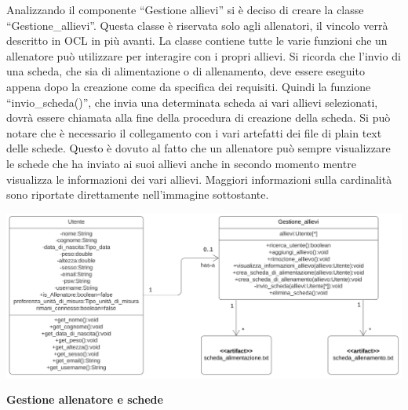 \documentclass{article}
\begin{document}
      Analizzando il componente “Gestione allievi” si è deciso di creare la classe “Gestione\_allievi”. Questa classe è riservata solo agli allenatori, il vincolo verrà descritto in OCL in più avanti. La classe contiene tutte le varie funzioni che un allenatore può utilizzare per interagire con i propri allievi. Si ricorda che l’invio di una scheda, che sia di alimentazione o di allenamento, deve essere eseguito appena dopo la creazione come da specifica dei requisiti. Quindi la funzione “invio\_scheda()”, che invia una determinata scheda ai vari allievi selezionati, dovrà essere chiamata alla fine della procedura di creazione della scheda.
      Si può notare che è necessario il collegamento con i vari artefatti dei file di plain text delle schede. Questo è dovuto al fatto che un allenatore può sempre visualizzare le schede che ha inviato ai suoi allievi anche in secondo momento mentre visualizza le informazioni dei vari allievi. Maggiori informazioni sulla cardinalità sono riportate direttamente nell’immagine sottostante.\\

      \begin{center}
            \includegraphics[scale=0.5]{classi/Gestione_allievi.png}
      \end{center}

      {\large\textbf{Gestione allenatore e schede}}\\
\end{document}
